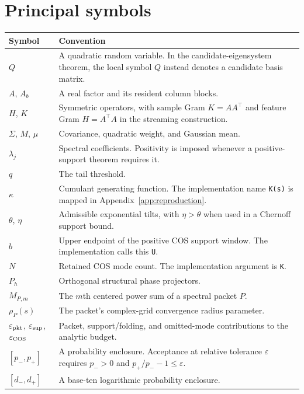 \clearpage\section{Principal symbols}
\begin{longtable}{@{}P{.25\linewidth}P{.70\linewidth}@{}}
\toprule
Symbol & Convention\\
\midrule
\endhead
$Q$ & A quadratic random variable. In the candidate-eigensystem theorem, the local symbol $Q$ instead denotes a candidate basis matrix.\\
$A$, $A_b$ & A real factor and its resident column blocks.\\
$H$, $K$ & Symmetric operators, with sample Gram $K=AA^\top$ and feature Gram $H=A^\top A$ in the streaming construction.\\
$\Sigma$, $M$, $\mu$ & Covariance, quadratic weight, and Gaussian mean.\\
$\lambda_j$ & Spectral coefficients. Positivity is imposed whenever a positive-support theorem requires it.\\
$q$ & The tail threshold.\\
$\kappa$ & Cumulant generating function. The implementation name \texttt{K(s)} is mapped in Appendix~\ref{app:reproduction}.\\
$\theta$, $\eta$ & Admissible exponential tilts, with $\eta>\theta$ when used in a Chernoff support bound.\\
$b$ & Upper endpoint of the positive COS support window. The implementation calls this \texttt{U}.\\
$N$ & Retained COS mode count. The implementation argument is \texttt{K}.\\
$P_h$ & Orthogonal structural phase projectors.\\
$M_{P,m}$ & The $m$th centered power sum of a spectral packet $P$.\\
$\rho_P(s)$ & The packet's complex-grid convergence radius parameter.\\
$\varepsilon_{\rm pkt}$, $\varepsilon_{\rm sup}$, $\varepsilon_{\rm COS}$ & Packet, support/folding, and omitted-mode contributions to the analytic budget.\\
$[p_-,p_+]$ & A probability enclosure. Acceptance at relative tolerance $\varepsilon$ requires $p_->0$ and $p_+/p_- -1\le\varepsilon$.\\
$[d_-,d_+]$ & A base-ten logarithmic probability enclosure.\\
\bottomrule
\end{longtable}


\endgroup
